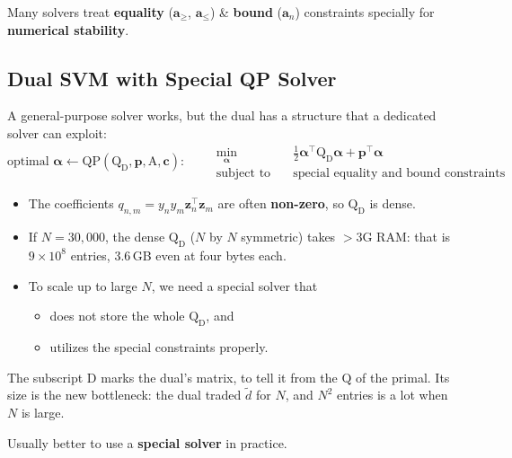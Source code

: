\begin{note}
    Many solvers treat \textbf{equality} (\(\bm{a}_{\ge}\),
    \(\bm{a}_{\le}\)) \& \textbf{bound} (\(\bm{a}_n\)) constraints specially
    for \textbf{numerical stability}.
\end{note}

\subsection{Dual SVM with Special QP Solver}

A general-purpose solver works, but the dual has a structure that a
dedicated solver can exploit:
\[
    \text{optimal } \bm{\alpha} \gets \mathrm{QP}(\mathrm{Q}_{\mathrm{D}},
    \bm{p}, \mathrm{A}, \bm{c}): \qquad
    \begin{aligned}
        \min_{\bm{\alpha}} \quad & \frac{1}{2} \bm{\alpha}^\top
            \mathrm{Q}_{\mathrm{D}} \bm{\alpha} + \bm{p}^\top \bm{\alpha}\\
        \text{subject to} \quad & \text{special equality and bound
            constraints}
    \end{aligned}
\]

\begin{itemize}
    \item The coefficients \(q_{n,m} = y_n y_m \bm{z}_n^\top \bm{z}_m\) are
        often \textbf{non-zero}, so \(\mathrm{Q}_{\mathrm{D}}\) is dense.
    \item If \(N = 30{,}000\), the dense \(\mathrm{Q}_{\mathrm{D}}\) (\(N\)
        by \(N\) symmetric) takes \(> 3\)G RAM: that is \(9 \times 10^8\)
        entries, \(3.6\)\,GB even at four bytes each.
    \item To scale up to large \(N\), we need a special solver that
        \begin{itemize}
            \item does not store the whole \(\mathrm{Q}_{\mathrm{D}}\), and
            \item utilizes the special constraints properly.
        \end{itemize}
\end{itemize}

The subscript D marks the dual's matrix, to tell it from the \(\mathrm{Q}\)
of the primal. Its size is the new bottleneck: the dual traded
\(\tilde{d}\) for \(N\), and \(N^2\) entries is a lot when \(N\) is large.

\begin{moral}
    Usually better to use a \textbf{special solver} in practice.
\end{moral}

